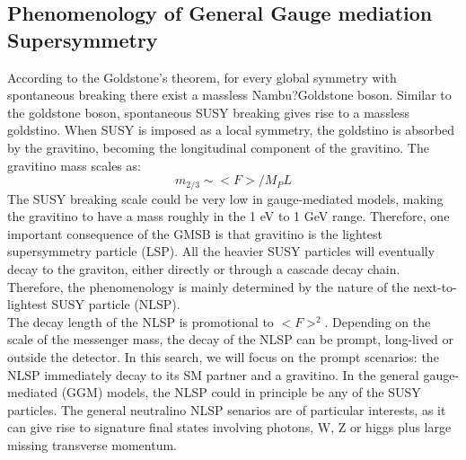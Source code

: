 \documentclass[thesis.tex]{subfiles}
\begin{document}
\subsection{Phenomenology of General Gauge mediation Supersymmetry}

According to the Goldstone's theorem, for every global symmetry with spontaneous breaking there exist a massless Nambu?Goldstone boson. 
Similar to the goldstone boson, spontaneous SUSY breaking gives rise to a massless goldstino. 
When SUSY is imposed as a local symmetry, the goldstino is absorbed by the gravitino, becoming the longitudinal component of the gravitino. 
The gravitino mass scales as:
	\begin{equation}
		m_{2/3} \sim <F>/M_PL
	\end{equation}
The SUSY breaking scale could be very low in gauge-mediated models, making the gravitino to have a mass roughly in the 1 eV to 1 GeV range.  
Therefore, one important consequence of the GMSB is that gravitino is the lightest supersymmetry particle (LSP).
All the heavier SUSY particles will eventually decay to the graviton, either directly or through a cascade decay chain. 
Therefore, the phenomenology is mainly determined by the nature of the next-to-lightest SUSY particle (NLSP).\\

The decay length of the NLSP is promotional to $<F>^2$. 
Depending on the scale of the messenger mass, the decay of the NLSP can be prompt, long-lived or outside the detector. 
In this search, we will focus on the prompt scenarios: the NLSP immediately decay to its SM partner and a gravitino. 
In the general gauge-mediated (GGM) models, the NLSP could in principle be any of the SUSY particles. 
The general neutralino NLSP senarios are of particular interests, as it can give rise to signature final states involving photons, W, Z or higgs plus large missing transverse momentum. \\
\end{document}
